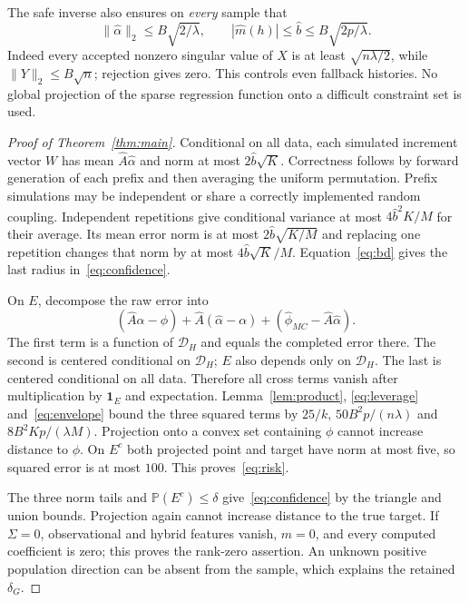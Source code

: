 \documentclass[11pt,a4paper]{article}
\numberwithin{equation}{section}
\theoremstyle{definition}
\newcommand{\Prb}{\mathbb P}
\newcommand{\ind}{\mathbf 1}
\begin{document}
The safe inverse also ensures on \emph{every} sample that
\begin{equation}\label{eq:envelope}
 \|\widehat\alpha\|_2\le B\sqrt{2/\lambda},\qquad
 |\widehat m(h)|\le\widehat b\le B\sqrt{2p/\lambda}.
\end{equation}
Indeed every accepted nonzero singular value of $X$ is at least
$\sqrt{n\lambda/2}$, while $\|Y\|_2\le B\sqrt n$; rejection gives zero.
This controls even fallback histories. No global projection of the
sparse regression function onto a difficult constraint set is used.

\begin{proof}[Proof of Theorem~\ref{thm:main}]
Conditional on all data, each simulated increment vector $W$ has mean
$\widehat A\widehat\alpha$ and norm at most $2\widehat b\sqrt K$.
Correctness follows by forward generation of each prefix and then
averaging the uniform permutation. Prefix simulations may be independent
or share a correctly implemented random coupling. Independent repetitions
give conditional variance at most $4\widehat b^2K/M$ for their average.
Its mean error norm is at most $2\widehat b\sqrt{K/M}$ and replacing
one repetition changes that norm by at most $4\widehat b\sqrt K/M$.
Equation~\eqref{eq:bd} gives the last radius in~\eqref{eq:confidence}.

On $E$, decompose the raw error into
\[
 (\widehat A\alpha-\phi)
 +\widehat A(\widehat\alpha-\alpha)
 +(\widehat\phi_{MC}-\widehat A\widehat\alpha).
\]
The first term is a function of $\mathcal D_H$ and equals the completed
error there. The second is centered conditional on $\mathcal D_H$;
$E$ also depends only on $\mathcal D_H$. The last is centered conditional
on all data. Therefore all cross terms vanish after multiplication by
$\ind_E$ and expectation. Lemma~\ref{lem:product},
\eqref{eq:leverage} and~\eqref{eq:envelope} bound the three squared
terms by $25/k$, $50B^2p/(n\lambda)$ and $8B^2Kp/(\lambda M)$.
Projection onto a convex set containing $\phi$ cannot increase distance
to $\phi$. On $E^c$ both projected point and target have norm at most
five, so squared error is at most $100$. This proves~\eqref{eq:risk}.

The three norm tails and $\Prb(E^c)\le\delta$ give~\eqref{eq:confidence}
by the triangle and union bounds. Projection again cannot increase
distance to the true target. If $\Sigma=0$, observational and hybrid
features vanish, $m=0$, and every computed coefficient is zero; this
proves the rank-zero assertion. An unknown positive population direction
can be absent from the sample, which explains the retained $\delta_G$.
\end{proof}
\end{document}
